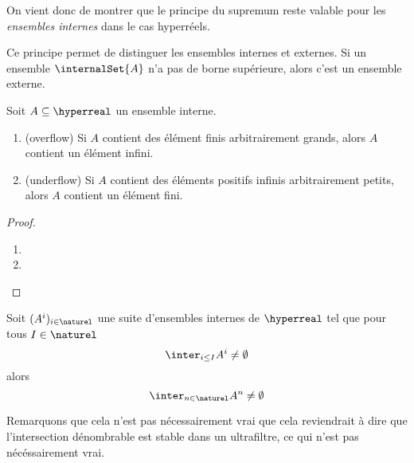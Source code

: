 On vient donc de montrer que le principe du supremum reste valable pour les
\textit{ensembles internes} dans le cas hyperréels.

Ce principe permet de distinguer les ensembles internes et externes. Si un
ensemble $\internalSet{A}$ n'a pas de borne supérieure, alors c'est un
ensemble externe.

\begin{proposition}
	Soit $A \subseteq \hyperreal$ un ensemble interne.

	\begin{enumerate}
		\item \label{overflow} (overflow) Si $A$ contient des élément finis
			arbitrairement grands, alors $A$ contient un élément infini.
		\item \label{underflow} (underflow) Si $A$ contient des éléments
			positifs infinis arbitrairement petits, alors $A$ contient un
			élément fini.
	\end{enumerate}
\end{proposition}

\ifdefined\outputproof
\begin{proof}
	\begin{enumerate}
		\item
		\item
	\end{enumerate}
\end{proof}
\fi

\begin{theorem} 
	\label{theorem:aleph_1_saturation}
	Soit $(A^{i})_{i \in \naturel}$ une suite d'ensembles internes de
	$\hyperreal$ tel que pour tous $I \in \naturel$
	\begin{equation}
		\inter_{i \leq I} A^{i} \neq \emptyset
	\end{equation}
	alors
	\begin{equation}
		\inter_{n \in \naturel} A^{n} \neq \emptyset
	\end{equation}
\end{theorem}

Remarquons que cela n'est pas nécessairement vrai que cela reviendrait à dire
que l'intersection dénombrable est stable dans un ultrafiltre, ce qui n'est pas
nécéssairement vrai.

